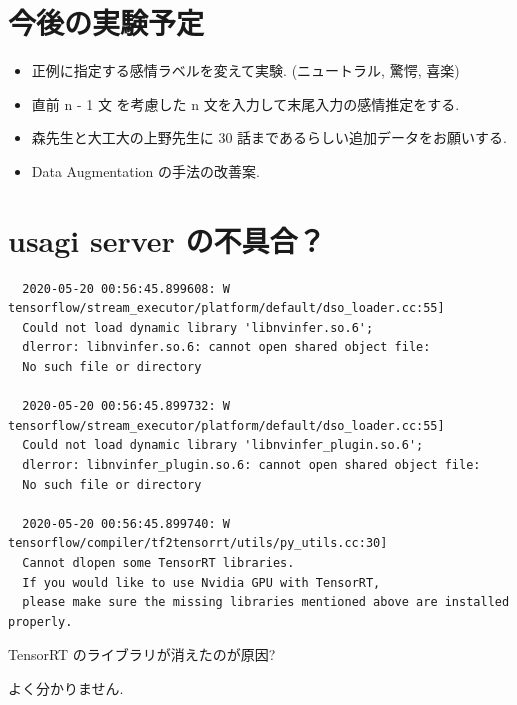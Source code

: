\documentclass[twocolumn]{jarticle}     %
\begin{document}
\section{今後の実験予定}
\begin{itemize}
  \item 正例に指定する感情ラベルを変えて実験. (ニュートラル, 驚愕, 喜楽)
  \item 直前 n - 1 文 を考慮した n 文を入力して末尾入力の感情推定をする.
  \item 森先生と大工大の上野先生に 30 話まであるらしい追加データをお願いする.
  \item Data Augmentation の手法の改善案.
\end{itemize}

\section{usagi server の不具合？}
\begin{verbatim}
  2020-05-20 00:56:45.899608: W tensorflow/stream_executor/platform/default/dso_loader.cc:55]
  Could not load dynamic library 'libnvinfer.so.6';
  dlerror: libnvinfer.so.6: cannot open shared object file:
  No such file or directory

  2020-05-20 00:56:45.899732: W tensorflow/stream_executor/platform/default/dso_loader.cc:55]
  Could not load dynamic library 'libnvinfer_plugin.so.6';
  dlerror: libnvinfer_plugin.so.6: cannot open shared object file:
  No such file or directory

  2020-05-20 00:56:45.899740: W tensorflow/compiler/tf2tensorrt/utils/py_utils.cc:30]
  Cannot dlopen some TensorRT libraries.
  If you would like to use Nvidia GPU with TensorRT,
  please make sure the missing libraries mentioned above are installed properly.

\end{verbatim}

TensorRT のライブラリが消えたのが原因?

よく分かりません.



\end{document}
